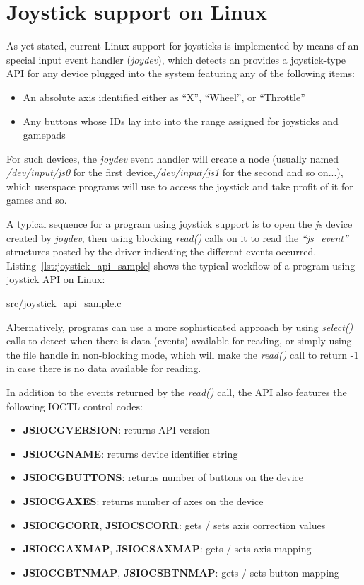 \section{Joystick support on Linux}
As yet stated, current Linux support for joysticks is implemented by means of an special input event handler (\emph{joydev}),  which detects an provides a joystick-type API for any device plugged into the system featuring any of the following items:
\begin{itemize}
	\item An absolute axis identified either as ``X'', ``Wheel'', or ``Throttle''
	\item Any buttons whose IDs lay into into the range assigned for joysticks and gamepads
\end{itemize}

For such devices, the \emph{joydev} event handler will create a node (usually named \emph{/dev/input/js0} for the first device,\emph{/dev/input/js1} for the second and so on...), which userspace programs will use to access the joystick and take profit of it for games and so.

A typical sequence for a program using joystick support is to open the \emph{js} device created by \emph{joydev}, then using blocking \emph{read()} calls on it to read the \emph{``js\_event''} structures posted by the driver indicating the different events occurred. 
Listing~\ref{lst:joystick_api_sample} shows the typical workflow of a program using joystick API on Linux:

{src/joystick_api_sample.c}

Alternatively, programs can use a more sophisticated approach by using \emph{select()} calls to detect when there is data (events) available for reading, or simply using the file handle in non-blocking mode, which will make the \emph{read()} call to return -1 in case there is no data available for reading.

In addition to the events returned by the \emph{read()} call, the API also features the following IOCTL control codes:
\begin{itemize}
	\item \textbf{JSIOCGVERSION}: returns API version
	\item \textbf{JSIOCGNAME}: returns device identifier string
	\item \textbf{JSIOCGBUTTONS}: returns number of buttons on the device
	\item \textbf{JSIOCGAXES}: returns number of axes on the device
	\item \textbf{JSIOCGCORR}, \textbf{JSIOCSCORR}: gets / sets axis correction values
	\item \textbf{JSIOCGAXMAP}, \textbf{JSIOCSAXMAP}: gets / sets axis mapping
	\item \textbf{JSIOCGBTNMAP}, \textbf{JSIOCSBTNMAP}: gets / sets button mapping
\end{itemize}


